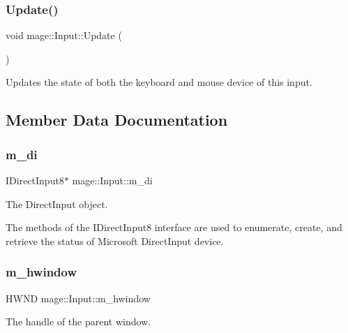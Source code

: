 \subsubsection{\texorpdfstring{Update()}{Update()}}
{\footnotesize\ttfamily void mage\+::\+Input\+::\+Update (\begin{DoxyParamCaption}{ }\end{DoxyParamCaption})}

Updates the state of both the keyboard and mouse device of this input. 

\subsection{Member Data Documentation}
\hypertarget{classmage_1_1_input_a6169d17f5a782039c7aefd0ffc5ba1bf}{}\label{classmage_1_1_input_a6169d17f5a782039c7aefd0ffc5ba1bf} 
\subsubsection{\texorpdfstring{m\+\_\+di}{m\_di}}
{\footnotesize\ttfamily I\+Direct\+Input8$\ast$ mage\+::\+Input\+::m\+\_\+di\hspace{0.3cm}{\ttfamily [private]}}

The Direct\+Input object.

The methods of the I\+Direct\+Input8 interface are used to enumerate, create, and retrieve the status of Microsoft Direct\+Input device. \hypertarget{classmage_1_1_input_a1b33f0e27c18870391633b1883c3f615}{}\label{classmage_1_1_input_a1b33f0e27c18870391633b1883c3f615} 
\subsubsection{\texorpdfstring{m\+\_\+hwindow}{m\_hwindow}}
{\footnotesize\ttfamily H\+W\+ND mage\+::\+Input\+::m\+\_\+hwindow\hspace{0.3cm}{\ttfamily [private]}}

The handle of the parent window. \hypertarget{classmage_1_1_input_a383109c45d2a0b0edeb482de8b53d53b}{}\label{classmage_1_1_input_a383109c45d2a0b0edeb482de8b53d53b} 
